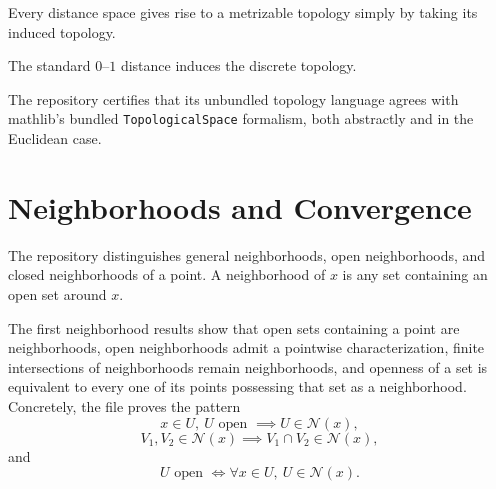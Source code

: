 \begin{remark}\label{rem:distance-gives-metrizable-1-19}
\leanok
Every distance space gives rise to a metrizable topology simply by taking its induced topology.
\end{remark}

\begin{example}\label{ex:discrete-metrizable-1-20}
\leanok
The standard $0$--$1$ distance induces the discrete topology.
\end{example}

\begin{remark}\label{rem:mathlib-certs-1}
\leanok
The repository certifies that its unbundled topology language agrees with mathlib's bundled \texttt{TopologicalSpace} formalism, both abstractly and in the Euclidean case.
\end{remark}

\chapter{Neighborhoods and Convergence}

\begin{definition}[Neighborhoods]\label{def:neighborhood-2-1}
\leanok
The repository distinguishes general neighborhoods, open neighborhoods, and closed neighborhoods of a point.
A neighborhood of $x$ is any set containing an open set around $x$.
\end{definition}

\begin{proposition}\label{prop:neighborhood-basic-2-1-2-4}
\leanok
The first neighborhood results show that open sets containing a point are neighborhoods, open neighborhoods admit a pointwise characterization, finite intersections of neighborhoods remain neighborhoods, and openness of a set is equivalent to every one of its points possessing that set as a neighborhood.
Concretely, the file proves the pattern
\[
x\in U,\ U\text{ open } \implies U\in\mathcal N(x),
\]
\[
V_1,V_2\in\mathcal N(x) \implies V_1\cap V_2\in\mathcal N(x),
\]
and
\[
U\text{ open } \iff \forall x\in U,\ U\in\mathcal N(x).
\]
\end{proposition}

